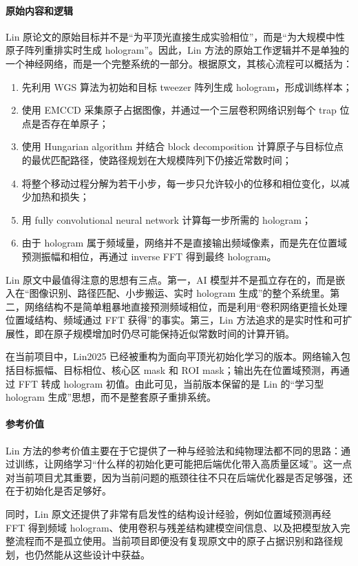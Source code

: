 \documentclass[12pt,a4paper]{ctexart}
\begin{document}
\paragraph{原始内容和逻辑}
Lin 原论文的原始目标并不是“为平顶光直接生成实验相位”，而是“为大规模中性原子阵列重排实时生成 hologram”。因此，Lin 方法的原始工作逻辑并不是单独的一个神经网络，而是一个完整系统的一部分。根据原文，其核心流程可以概括为：
\begin{enumerate}[label=\arabic*.]
    \item 先利用 WGS 算法为初始和目标 tweezer 阵列生成 hologram，形成训练样本；
    \item 使用 EMCCD 采集原子占据图像，并通过一个三层卷积网络识别每个 trap 位点是否存在单原子；
    \item 使用 Hungarian algorithm 并结合 block decomposition 计算原子与目标位点的最优匹配路径，使路径规划在大规模阵列下仍接近常数时间；
    \item 将整个移动过程分解为若干小步，每一步只允许较小的位移和相位变化，以减少加热和损失；
    \item 用 fully convolutional neural network 计算每一步所需的 hologram；
    \item 由于 hologram 属于频域量，网络并不是直接输出频域像素，而是先在位置域预测振幅和相位，再通过 inverse FFT 得到最终 hologram。
\end{enumerate}

Lin 原文中最值得注意的思想有三点。第一，AI 模型并不是孤立存在的，而是嵌入在“图像识别、路径匹配、小步搬运、实时 hologram 生成”的整个系统里。第二，网络结构不是简单粗暴地直接预测频域相位，而是利用“卷积网络更擅长处理位置域结构、频域通过 FFT 获得”的事实。第三，Lin 方法追求的是实时性和可扩展性，即在原子规模增加时仍尽可能保持近似常数时间的计算开销。

在当前项目中，Lin2025 已经被重构为面向平顶光初始化学习的版本。网络输入包括目标振幅、目标相位、核心区 mask 和 ROI mask；输出先在位置域预测，再通过 FFT 转成 hologram 初值。由此可见，当前版本保留的是 Lin 的“学习型 hologram 生成”思想，而不是整套原子重排系统。

\paragraph{参考价值}
Lin 方法的参考价值主要在于它提供了一种与经验法和纯物理法都不同的思路：通过训练，让网络学习“什么样的初始化更可能把后端优化带入高质量区域”。这一点对当前项目尤其重要，因为当前问题的瓶颈往往不只在后端优化器是否足够强，还在于初始化是否足够好。

同时，Lin 原文还提供了非常有启发性的结构设计经验，例如位置域预测再经 FFT 得到频域 hologram、使用卷积与残差结构建模空间信息、以及把模型放入完整流程而不是孤立使用。当前项目即便没有复现原文中的原子占据识别和路径规划，也仍然能从这些设计中获益。
\end{document}
